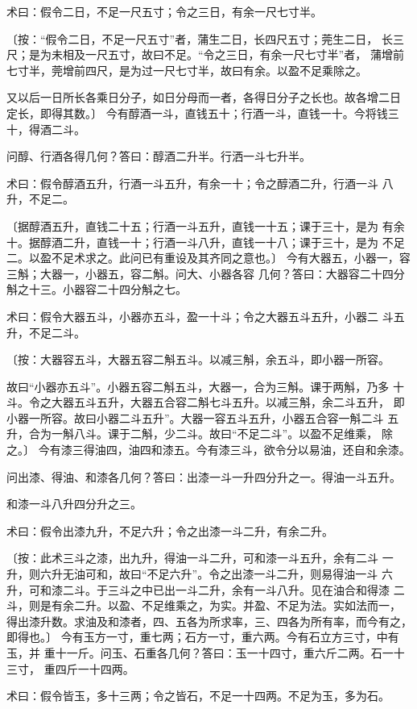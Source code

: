 \documentclass[a4paper,12pt,UTF8,twoside]{ctexbook}
\begin{document}
术曰：假令二日，不足一尺五寸；令之三日，有余一尺七寸半。

〔按：“假令二日，不足一尺五寸”者，蒲生二日，长四尺五寸；莞生二日， 长三尺；是为未相及一尺五寸，故曰不足。“令之三日，有余一尺七寸半”者， 蒲增前七寸半，莞增前四尺，是为过一尺七寸半，故曰有余。以盈不足乘除之。

又以后一日所长各乘日分子，如日分母而一者，各得日分子之长也。故各增二日 定长，即得其数。〕 今有醇酒一斗，直钱五十；行酒一斗，直钱一十。今将钱三十，得酒二斗。

问醇、行酒各得几何？答曰：醇酒二升半。行洒一斗七升半。

术曰：假令醇酒五升，行酒一斗五升，有余一十；令之醇酒二升，行酒一斗 八升，不足二。

〔据醇酒五升，直钱二十五；行酒一斗五升，直钱一十五；课于三十，是为 有余十。据醇酒二升，直钱一十；行酒一斗八升，直钱一十八；课于三十，是为 不足二。以盈不足术求之。此问已有重设及其齐同之意也。〕 今有大器五，小器一，容三斛；大器一，小器五，容二斛。问大、小器各容 几何？答曰：大器容二十四分斛之十三。小器容二十四分斛之七。

术曰：假令大器五斗，小器亦五斗，盈一十斗；令之大器五斗五升，小器二 斗五升，不足二斗。

〔按：大器容五斗，大器五容二斛五斗。以减三斛，余五斗，即小器一所容。

故曰“小器亦五斗”。小器五容二斛五斗，大器一，合为三斛。课于两斛，乃多 十斗。令之大器五斗五升，大器五合容二斛七斗五升。以减三斛，余二斗五升， 即小器一所容。故曰小器二斗五升”。大器一容五斗五升，小器五合容一斛二斗 五升，合为一斛八斗。课于二斛，少二斗。故曰“不足二斗”。以盈不足维乘， 除之。〕 今有漆三得油四，油四和漆五。今有漆三斗，欲令分以易油，还自和余漆。

问出漆、得油、和漆各几何？答曰：出漆一斗一升四分升之一。得油一斗五升。

和漆一斗八升四分升之三。

术曰：假令出漆九升，不足六升；令之出漆一斗二升，有余二升。

〔按：此术三斗之漆，出九升，得油一斗二升，可和漆一斗五升，余有二斗 一升，则六升无油可和，故曰“不足六升”。令之出漆一斗二升，则易得油一斗 六升，可和漆二斗。于三斗之中已出一斗二升，余有一斗八升。见在油合和得漆 二斗，则是有余二升。以盈、不足维乘之，为实。并盈、不足为法。实如法而一， 得出漆升数。求油及和漆者，四、五各为所求率，三、四各为所有率，而今有之， 即得也。〕 今有玉方一寸，重七两；石方一寸，重六两。今有石立方三寸，中有玉，并 重十一斤。问玉、石重各几何？答曰：玉一十四寸，重六斤二两。石一十三寸， 重四斤一十四两。

术曰：假令皆玉，多十三两；令之皆石，不足一十四两。不足为玉，多为石。
\end{document}

